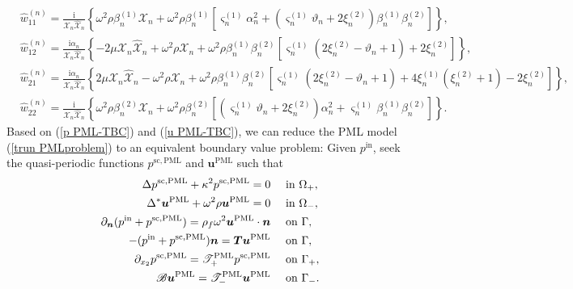 \documentclass[final,3p,times]{elsarticle}
\begin{document}
\begin{align*}
	& \hat{w}_{11}^{(n) }= \frac{\mathrm{i}}{ \mathcal{X}_{n} \hat{\mathcal{X}}_{n}}\left\{
	\omega^2 \rho \beta_n^{(1)}\mathcal{X}_{n}+ \omega^2\rho \beta_n^{(1)}\left[\varsigma_n^{(1)} \alpha_n^2+\left(\varsigma_n^{(1)} \vartheta_{n}+2 \xi_n^{(2)}\right) \beta_n^{(1)} \beta_n^{(2)}\right]\right\}, \\
	& \hat{w}_{12}^{(n)} = \frac{\mathrm{i}\alpha_n}{ \mathcal{X}_{n} \hat{\mathcal{X}}_{n}}\left\{
	- 2\mu \mathcal{X}_{n} \hat{\mathcal{X}}_{n} 
	+ \omega^2\rho \mathcal{X}_{n} 
	+ \omega^2\rho \beta_n^{(1)}\beta_n^{(2)}   \left[\varsigma_n^{(1)}\left(2 \xi_n^{(2)}
	-\vartheta_{n}+1\right)+2 \xi_n^{(2)}\right] \right\}, \\
	& \hat{w}_{21}^{(n)} = \frac{\mathrm{i}\alpha_n}{ \mathcal{X}_{n} \hat{\mathcal{X}}_{n}} \left\{
	2\mu\mathcal{X}_{n} \hat{\mathcal{X}}_{n} 
	- \omega^2 \rho \mathcal{X}_{n}
	+ \omega^2\rho  \beta_n^{(1)} \beta_n^{(2)} 
	\left[\varsigma_n^{(1)}\left(2 \xi_n^{(2)}-\vartheta_{n}+1\right)+ 4\xi_n^{(1)}\left(  \xi_n^{(2)} + 1\right) -2\xi_n^{(2)} \right] \right\}, \\
	& \hat{w}_{22}^{(n)}=\frac{\mathrm{i}}{ \mathcal{X}_{n} \hat{\mathcal{X}}_{n}} \left\{
	\omega^2 \rho \beta_n^{(2)}\mathcal{X}_{n}
	+ \omega^2 \rho \beta_n^{(2)}
	\left[\left(\varsigma_n^{(1)} \vartheta_{n}+2 \xi_n^{(2)}\right) \alpha_n^2 + \varsigma_n^{(1)} \beta_n^{(1)} \beta_n^{(2)}\right] \right\}.
\end{align*}
Based on (\ref{p PML-TBC}) and (\ref{u PML-TBC}), we can reduce the PML model (\ref{trun PMLproblem}) to an equivalent boundary value problem: Given $p^\mathrm{in}$, seek the quasi-periodic functions $p^{\mathrm{sc},\mathrm{PML}}$ and $\boldsymbol{u}^{\mathrm{PML}}$ such that
\begin{align}\label{PMLproblem}
	\Delta p^{\mathrm{sc},\mathrm{PML}}+\kappa^2 p^{\mathrm{sc},\mathrm{PML}}=0 & \quad\text { in } \Omega_+, \notag\\
	\Delta^* \boldsymbol{u}^\mathrm{PML} + \omega^2\rho \boldsymbol{u}^\mathrm{PML}=0 & \quad\text { in } \Omega_-, \notag \\
	\partial_{\boldsymbol{n}} (p^\mathrm{in}+p^{\mathrm{sc},\mathrm{PML}}) =\rho_f \omega^2 \boldsymbol{u}^\mathrm{PML} \cdot \boldsymbol{n} & \quad\text { on } \Gamma,  \\
	-(p^\mathrm{in}+p^{\mathrm{sc},\mathrm{PML}}) \boldsymbol{n}=\boldsymbol{T} \boldsymbol{u}^\mathrm{PML} & \quad\text { on } \Gamma, \notag \\
	\partial_{x_2} p^{\mathrm{sc},\mathrm{PML}}=\mathscr{T}_+^\mathrm{PML} p^{\mathrm{sc},\mathrm{PML}} & \quad\text { on } \Gamma_+, \notag\\
	\mathscr{B} \boldsymbol{u}^\mathrm{PML}=\mathscr{T}_-^\mathrm{PML} \boldsymbol{u}^\mathrm{PML} &\quad \text { on } \Gamma_-.\notag
\end{align}
\end{document}
